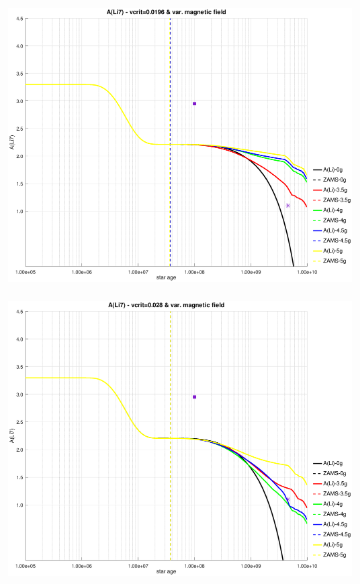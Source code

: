 \documentclass[fleqn,usenatbib]{mnras}
\begin{document}
\begin{figure}
\begin{subfigure}[h]{0.47\textwidth}
    \includegraphics[trim = 40mm 15mm 15mm 15mm, clip,width=\textwidth]{figures/li_vc_0196_var_g.eps}
    \label{fig:subim23}
    \end{subfigure}
    \begin{subfigure}[h]{0.47\textwidth}
    \includegraphics[trim = 40mm 15mm 15mm 15mm, clip,width=\textwidth]{figures/li_vc_028_var_g.eps}
    \label{fig:subim24}
    \end{subfigure}
    \begin{subfigure}[h]{0.47\textwidth}

\end{subfigure}
\end{figure}
\end{document}
